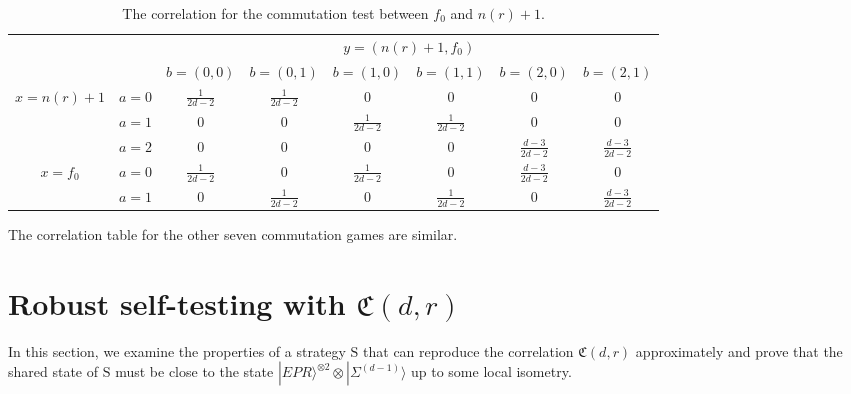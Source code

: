 \documentclass[11pt,letterpaper]{article}
\newcommand{\ket}[1]{|#1\rangle}
\newcommand{\x}{\otimes}
\newcommand{\1}{\mathbb{1}}
\newcommand{\EPR}[1]{\Sigma^{(#1)}}
\newcommand{\nr}{n(r)}
\newcommand{\fC}{\mathfrak{C}}
\newcommand{\bS}{\mathrm{S}}
\theoremstyle{definition}
\begin{document}
\begin{table}[H]
\begin{center}
\begin{tabular}{|c|c||c|c|c|c|c|c|}
\hline
\multicolumn{2}{|c|}{} &
\multicolumn{6}{|c|}{$y=(\nr+1, f_0)$}\\
\cline{3-8}
\multicolumn{2}{|c|}{} &
$b = (0,0)$ & $b=(0,1)$ & 
$b = (1,0)$ & $b=(1,1)$ &
$b = (2,0)$ & $b=(2,1)$   \\
\hline
\hline
\multirow{3}{*}{$x = \nr+1$} & $a=0$ & $\frac{1}{2d-2}$ & $\frac{1}{2d-2}$ &  $0$
& $0$ & $0$ & $0$  \\
\cline{2-8}
&$a=1$ & $0$ & $0 $ & $\frac{1}{2d-2}$ 
&  $\frac{1}{2d-2}$ & $0$ & $0$  \\
\cline{2-8}
&$a=2$ & 0 & 0 & $0$ 
&  0 & $\frac{d-3}{2d-2}$ & $\frac{d-3}{2d-2} $  \\
\hline
\multirow{2}{*}{$x = f_0$} & $a=0$ & $\frac{1}{2d-2}$ & $0$ & $\frac{1}{2d-2}$ 
& $0$ & $\frac{d-3}{2d-2}$ & 0  \\
\cline{2-8}
&$a=1$ & $0$ & $\frac{1}{2d-2}$ & $0$ 
&  $\frac{1}{2d-2}$ & $0$ & $\frac{d-3}{2d-2}$  \\
\hline
\end{tabular}
\end{center}
\caption{The correlation for the commutation test between $f_0$ and $\nr+1$.}
\label{tbl:comm}
\end{table}
The correlation table for the other seven commutation games are similar.

\section{Robust self-testing with $\fC(d,r)$}
\label{sec:main}
In this section, we examine the properties of a strategy $\bS$ that can reproduce the
correlation $\fC(d,r)$ approximately and 
prove that the shared state of $\bS$ must be close to the state $\ket{EPR}^{\x 2} \x \ket{\EPR{d-1}}$
up to some local isometry.
\end{document}
